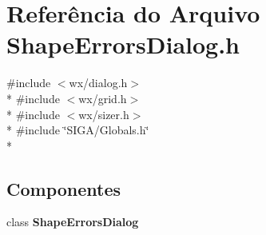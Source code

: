\section{Referência do Arquivo Shape\+Errors\+Dialog.\+h}
\label{_shape_errors_dialog_8h}
{\ttfamily \#include $<$wx/dialog.\+h$>$}\\*
{\ttfamily \#include $<$wx/grid.\+h$>$}\\*
{\ttfamily \#include $<$wx/sizer.\+h$>$}\\*
{\ttfamily \#include \char`\"{}S\+I\+G\+A/\+Globals.\+h\char`\"{}}\\*
\subsection*{Componentes}
\begin{DoxyCompactItemize}
\item 
class {\bf Shape\+Errors\+Dialog}
\end{DoxyCompactItemize}
